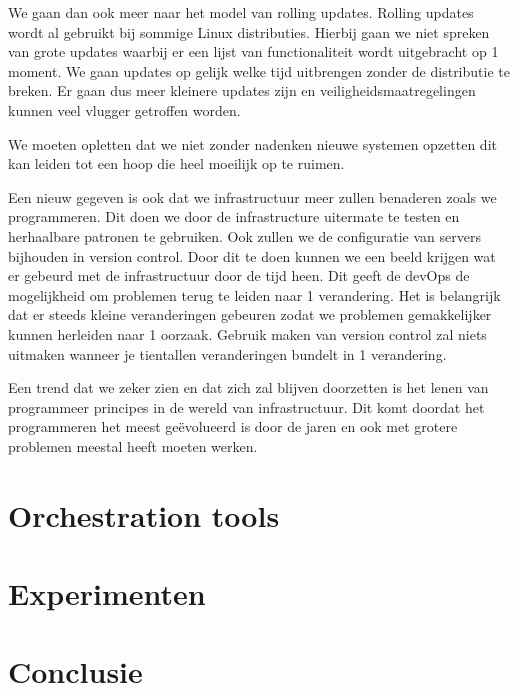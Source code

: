 \documentclass[pdftex,a4paper,12pt,twoside]{report}
\begin{document}
We gaan dan ook meer naar het model van rolling updates. Rolling updates wordt al gebruikt bij sommige Linux distributies. Hierbij gaan we niet spreken van grote updates waarbij er een lijst van functionaliteit wordt uitgebracht op 1 moment. We gaan updates op gelijk welke tijd uitbrengen zonder de distributie te breken. Er gaan dus meer kleinere updates zijn en veiligheidsmaatregelingen kunnen veel vlugger getroffen worden.

We moeten opletten dat we niet zonder nadenken nieuwe systemen opzetten dit kan leiden tot een hoop die heel moeilijk op te ruimen. 

Een nieuw gegeven is ook dat we infrastructuur meer zullen benaderen zoals we programmeren. Dit doen we door de infrastructure uitermate te testen en herhaalbare patronen te gebruiken. Ook zullen we de configuratie van servers bijhouden in version control. Door dit te doen kunnen we een beeld krijgen wat er gebeurd met de infrastructuur door de tijd heen. Dit geeft de devOps de mogelijkheid om problemen terug te leiden naar 1 verandering. Het is belangrijk dat er steeds kleine veranderingen gebeuren zodat we problemen gemakkelijker kunnen herleiden naar 1 oorzaak. Gebruik maken van version control zal niets uitmaken wanneer je tientallen veranderingen bundelt in 1 verandering. 

Een trend dat we zeker zien en dat zich zal blijven doorzetten is het lenen van programmeer principes in de wereld van infrastructuur. Dit komt doordat het programmeren het meest geëvolueerd is door de jaren en ook met grotere problemen meestal heeft moeten werken.

\chapter{Orchestration tools}
\label{ch:orchestration-tools}



\chapter{Experimenten}
\label{ch:experimenten}



\chapter{Conclusie}
\label{ch:conclusie}







\listoffigures
\listoftables
\end{document}

